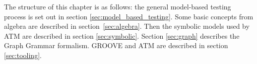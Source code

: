 The structure of this chapter is as follows: the general model-based testing process is set out in section \ref{sec:model_based_testing}. Some basic concepts from algebra are described in section~\ref{sec:algebra}. Then the symbolic models used by ATM are described in section \ref{sec:symbolic}. Section \ref{sec:graph} describes the Graph Grammar formalism. GROOVE and ATM are described in section \ref{sec:tooling}.
